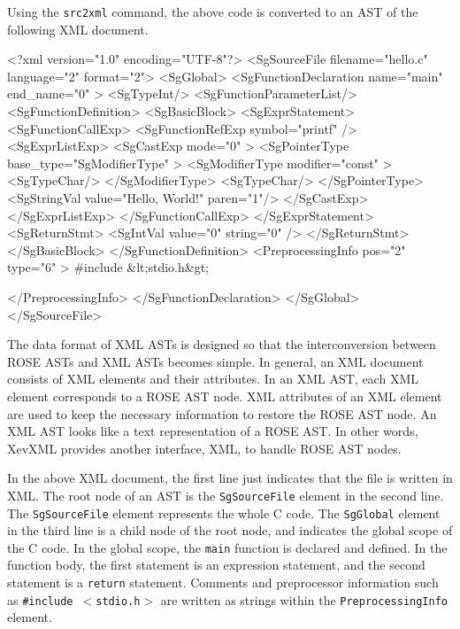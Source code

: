 Using the \texttt{src2xml} command, the above code is converted to an
AST of the following XML document.

\begin{framed}
\begin{src}
<?xml version="1.0" encoding="UTF-8"?>
<SgSourceFile filename="hello.c" language="2" format="2">
  <SgGlobal>
    <SgFunctionDeclaration name="main"  end_name="0" >
        <SgTypeInt/>
      <SgFunctionParameterList/>
      <SgFunctionDefinition>
        <SgBasicBlock>
          <SgExprStatement>
            <SgFunctionCallExp>
              <SgFunctionRefExp symbol="printf" />
              <SgExprListExp>
                <SgCastExp mode="0" >
                    <SgPointerType base_type="SgModifierType" >
                      <SgModifierType modifier="const" >
                        <SgTypeChar/>
                      </SgModifierType>
                      <SgTypeChar/>
                    </SgPointerType>
                  <SgStringVal value="Hello, World!\n" paren="1"/>
                </SgCastExp>
              </SgExprListExp>
            </SgFunctionCallExp>
          </SgExprStatement>
          <SgReturnStmt>
            <SgIntVal value="0"  string="0" />
          </SgReturnStmt>
        </SgBasicBlock>
      </SgFunctionDefinition>
<PreprocessingInfo pos="2"  type="6" >
#include &lt;stdio.h&gt;

</PreprocessingInfo>
    </SgFunctionDeclaration>
  </SgGlobal>
</SgSourceFile>
\end{src}
\end{framed}

The data format of XML ASTs is designed so that the interconversion
between ROSE ASTs and XML ASTs becomes simple.  In general, an XML
document consists of XML elements and their attributes. In an XML AST,
each XML element corresponds to a ROSE AST node. XML attributes of an
XML element are used to keep the necessary information to restore the
ROSE AST node.  An XML AST looks like a text representation of a ROSE
AST.  In other words, XevXML provides another interface, XML, to handle
ROSE AST nodes.

In the above XML document, the first line just indicates that the file
is written in XML.  The root node of an AST is the \texttt{SgSourceFile}
element in the second line. The \texttt{SgSourceFile} element represents
the whole C code.  The \texttt{SgGlobal} element in the third line is a
child node of the root node, and indicates the global scope of the C
code. In the global scope, the \texttt{main} function is declared and
defined. In the function body, the first statement is an expression
statement, and the second statement is a \texttt{return}
statement. Comments and preprocessor information such as
\texttt{\#include $<$stdio.h$>$} are written as strings within the
\texttt{PreprocessingInfo} element.

